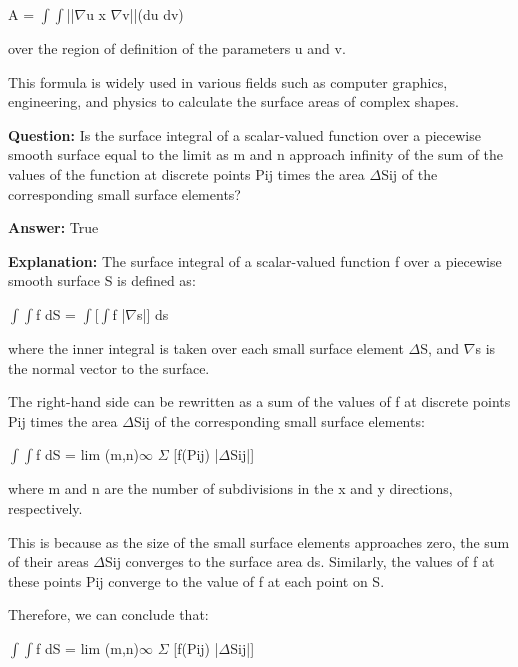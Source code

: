 \documentclass{article}
\begin{document}
A = \ensuremath{\int}\ensuremath{\int}||\ensuremath{\nabla}u x \ensuremath{\nabla}v||(du dv)

over the region of definition of the parameters u and v.

This formula is widely used in various fields such as computer graphics, engineering, and physics to calculate the surface areas of complex shapes.
                
                \vspace{0.5cm} 
        
            
                \textbf {Question:} Is the surface integral of a scalar-valued function over a piecewise smooth surface equal to the limit as m and n approach infinity of the sum of the values of the function at discrete points Pij times the area \ensuremath{\Delta}Sij of the corresponding small surface elements?
                
                \textbf{Answer:} True

                \textbf{Explanation:} The surface integral of a scalar-valued function f over a piecewise smooth surface S is defined as:

\ensuremath{\int}\ensuremath{\int}f dS = \ensuremath{\int}[\ensuremath{\int}f |\ensuremath{\nabla}s|] ds

where the inner integral is taken over each small surface element \ensuremath{\Delta}S, and \ensuremath{\nabla}s is the normal vector to the surface.

The right-hand side can be rewritten as a sum of the values of f at discrete points Pij times the area \ensuremath{\Delta}Sij of the corresponding small surface elements:

\ensuremath{\int}\ensuremath{\int}f dS = lim (m,n){\textrightarrow}\ensuremath{\infty} \ensuremath{\Sigma} [f(Pij) |\ensuremath{\Delta}Sij|]

where m and n are the number of subdivisions in the x and y directions, respectively.

This is because as the size of the small surface elements approaches zero, the sum of their areas \ensuremath{\Delta}Sij converges to the surface area ds. Similarly, the values of f at these points Pij converge to the value of f at each point on S.

Therefore, we can conclude that:

\ensuremath{\int}\ensuremath{\int}f dS = lim (m,n){\textrightarrow}\ensuremath{\infty} \ensuremath{\Sigma} [f(Pij) |\ensuremath{\Delta}Sij|]
\end{document}
